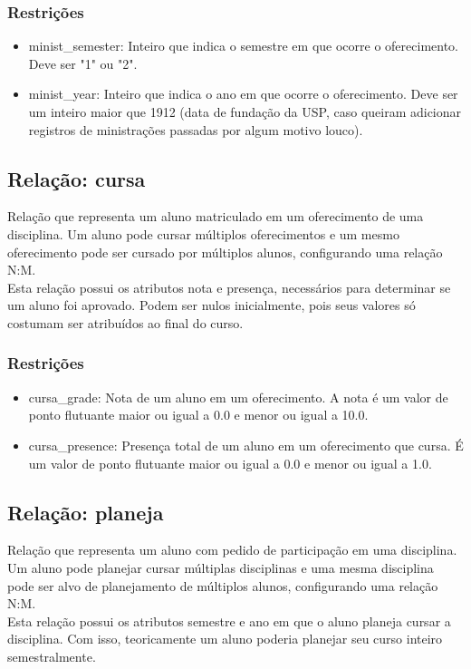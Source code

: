 \documentclass{article}
\begin{document}
  	    \subsubsection{Restrições}
  	        \begin{itemize}
  	            \item minist\_semester: Inteiro que indica o semestre em que ocorre o oferecimento. Deve ser "1" ou "2".
  	            \item minist\_year: Inteiro que indica o ano em que ocorre o oferecimento. Deve ser um inteiro maior que 1912 (data de fundação da USP, caso queiram adicionar registros de ministrações passadas por algum motivo louco).
  	        \end{itemize}
  	     
  	\subsection{Relação: cursa}
  	    \quad Relação que representa um aluno matriculado em um oferecimento de uma disciplina. Um aluno pode cursar múltiplos oferecimentos e um mesmo oferecimento pode ser cursado por múltiplos alunos, configurando uma relação N:M. \\
  	    \null \quad Esta relação possui os atributos nota e presença, necessários para determinar se um aluno foi aprovado. Podem ser nulos inicialmente, pois seus valores só costumam ser atribuídos ao final do curso.
  	    \subsubsection{Restrições}
  	        \begin{itemize}
  	            \item cursa\_grade: Nota de um aluno em um oferecimento. A nota é um valor de ponto flutuante maior ou igual a 0.0 e menor ou igual a 10.0.
  	            \item cursa\_presence: Presença total de um aluno em um oferecimento que cursa. É um valor de ponto flutuante maior ou igual a 0.0 e menor ou igual a 1.0.
  	         \end{itemize}

  	\subsection{Relação: planeja}
  	    \quad Relação que representa um aluno com pedido de participação em uma disciplina. Um aluno pode planejar cursar múltiplas disciplinas e uma mesma disciplina pode ser alvo de planejamento de múltiplos alunos, configurando uma relação N:M. \\
  	    \null \quad Esta relação possui os atributos semestre e ano em que o aluno planeja cursar a disciplina. Com isso, teoricamente um aluno poderia planejar seu curso inteiro semestralmente.
\end{document}
